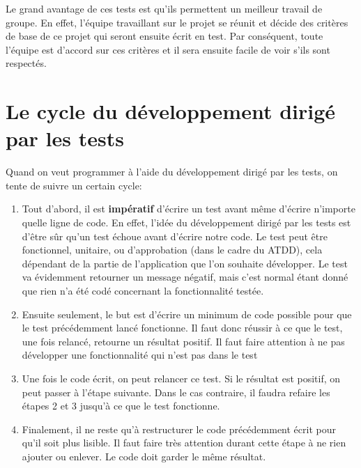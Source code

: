 \documentclass[a4paper,10pt,french]{sphinxmanual}
\begin{document}
Le grand avantage de ces tests est qu'ils permettent un meilleur travail de
groupe. En effet, l'équipe travaillant sur le projet se réunit et décide des
critères de base de ce projet qui seront ensuite écrit en test. Par conséquent,
toute l'équipe est d'accord sur ces critères et il sera ensuite facile de voir
s'ils sont respectés.


\section{Le cycle du développement dirigé par les tests}
\label{tdd:le-cycle-du-developpement-dirige-par-les-tests}
Quand on veut programmer à l'aide du développement dirigé par les tests, on
tente de suivre un certain cycle:
\begin{enumerate}
\item {} 
Tout d'abord, il est \textbf{impératif} d'écrire un test avant même d'écrire
n'importe quelle ligne de code. En effet, l'idée du développement dirigé par
les tests est d'être sûr qu'un test échoue avant d'écrire notre code. Le
test peut être fonctionnel, unitaire, ou d'approbation (dans le cadre du
ATDD), cela dépendant de la partie de l'application que l'on souhaite
développer. Le test va évidemment retourner un message négatif, mais c'est
normal étant donné que rien n'a été codé concernant la fonctionnalité
testée.

\item {} 
Ensuite seulement, le but est d'écrire un minimum de code possible
pour que le test précédemment lancé fonctionne. Il faut donc réussir
à ce que le test, une fois relancé, retourne un résultat positif. Il faut
faire attention à ne pas développer une fonctionnalité qui n'est pas dans
le test

\item {} 
Une fois le code écrit, on peut relancer ce test. Si le résultat
est positif, on peut passer à l'étape suivante. Dans le cas contraire,
il faudra refaire les étapes 2 et 3 jusqu'à ce que le test fonctionne.

\item {} 
Finalement, il ne reste qu'à restructurer le code précédemment écrit pour
qu'il soit plus lisible. Il faut faire très attention durant cette étape à
ne rien ajouter ou enlever. Le code doit garder le même résultat.

\end{enumerate}
\end{document}
